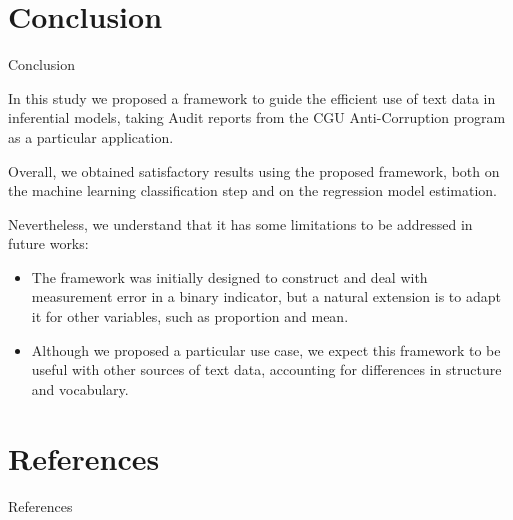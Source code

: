 \documentclass[handout,t,usenames,dvipsnames]{beamer}
\begin{document}
\section{Conclusion}

\begin{frame}{Conclusion}
\justifying
\vspace{1em}
\small

In this study we proposed a framework to guide the efficient use of text data in inferential models, taking Audit reports from the CGU Anti-Corruption program as a particular application.

\vspace{1em}
Overall, we obtained satisfactory results using the proposed framework, both on the machine learning classification step and on the regression model estimation.

\vspace{1em}
Nevertheless, we understand that it has some limitations to be addressed in future works:
\begin{itemize}
\small
\justifying
    \item The framework was initially designed to construct and deal with measurement error in a binary indicator, but a natural extension is to adapt it for other variables, such as proportion and mean.
    \item Although we proposed a particular use case, we expect this framework to be useful with other sources of text data, accounting for differences in structure and vocabulary. 
\end{itemize} 

\vspace{1em}


\end{frame}



\section{References}

\begin{frame}[allowframebreaks]{References}




\end{frame}
\end{document}
